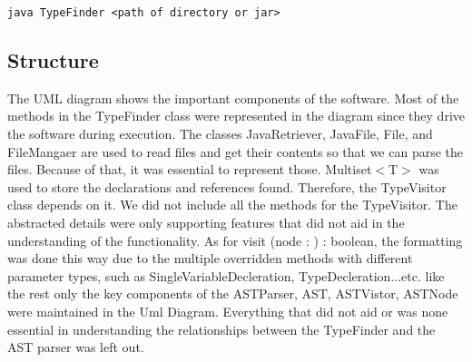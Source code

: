 \documentclass[12p]{article}
\newcommand{\code}[1]{\texttt{#1}}
\begin{document}
\code{java TypeFinder <path of directory or jar>}

\subsection{Structure}
The UML diagram shows the important components of the software. Most of the methods in the TypeFinder class were represented in the diagram since they drive the software during execution. The classes JavaRetriever, JavaFile, File, and FileMangaer are used to read files and get their contents so that we can parse the files. Because of that, it was essential to represent those. Multiset$<$T$>$ was used to store the declarations and references found. Therefore, the TypeVisitor class depends on it. We did not include all the methods for the TypeVisitor. The abstracted details were only supporting features that did not aid in the understanding of the functionality. As for visit (node : ) : boolean, the formatting was done this way due to the multiple overridden methods with different parameter types, such as SingleVariableDecleration, TypeDecleration...etc. like the rest only the key components of the ASTParser, AST, ASTVistor, ASTNode were maintained in the Uml Diagram. Everything that did not aid or was none essential in understanding the relationships between the TypeFinder and the AST parser was left out.
\end{document}
